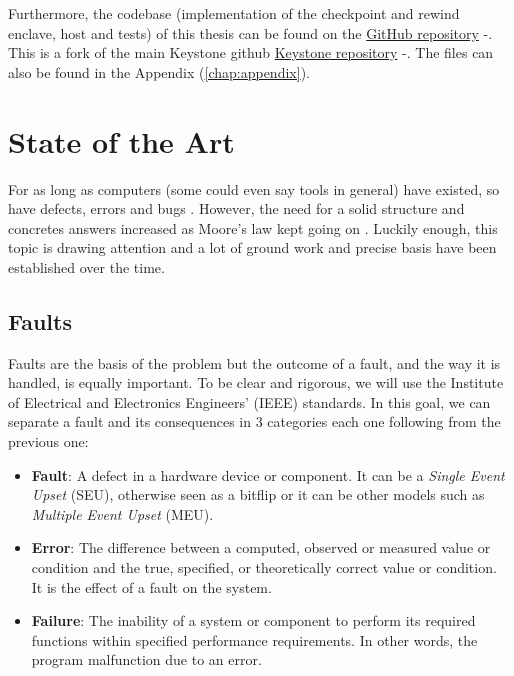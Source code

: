 \documentclass[11pt,a4paper]{report}
\newcommand{\github}{%
    \href{https://github.com/ldevroye/keystone/tree/master}{GitHub repository}
}
\newcommand{\keystonegithub}{%
    \href{https://github.com/keystone-enclave/keystone}{Keystone repository} \cite{keystone-repo}
}
\begin{document}
Furthermore, the codebase (implementation of the checkpoint and rewind enclave, host and tests) of this thesis can be found on the \github-. 
This is a fork of the main Keystone github \keystonegithub-. 
The files can also be found in the Appendix (\ref{chap:appendix}).




\chapter{State of the Art}
\label{chap:SotA}
For as long as computers (some could even say tools in general) have existed, so have defects, errors and bugs \cite{vonneumann56}. 
However, the need for a solid structure and concretes answers increased as Moore's law kept going on \cite{moore-law}. 
Luckily enough, this topic is drawing attention and a lot of ground work and precise basis have been established over the time.

\section{Faults}
Faults are the basis of the problem but the outcome of a fault, and the way it is handled, is equally important. 
To be clear and rigorous, we will use the Institute of Electrical and Electronics Engineers' (IEEE) \cite{future-research, ieee, other-goal} standards.
In this goal, we can separate a fault and its consequences in 3 categories each one following from the previous one:
\begin{itemize}
    \item \textbf{Fault}: A defect in a hardware device or component. 
    It can be a \textit{Single Event Upset} (SEU), otherwise seen as a bitflip or it can be other models such as \textit{Multiple Event Upset} (MEU).
    \item \textbf{Error}: The difference between a computed, observed or measured value or condition and the true, specified, or theoretically correct value or condition. 
    It is the effect of a fault on the system.
    \item \textbf{Failure}: The inability of a system or component to perform its required functions within specified performance requirements. 
    In other words, the program malfunction due to an error.
\end{itemize}
\end{document}
